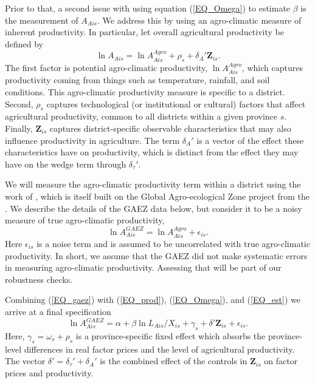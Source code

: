 \documentclass[11pt]{article}
\begin{document}
Prior to that, a second issue with using equation (\ref{EQ_Omega}) to estimate $\beta$ is the measurement of $A_{Ais}$. We address this by using an agro-climatic measure of inherent productivity. In particular, let overall agricultural productivity be defined by 
\begin{equation}
	\ln A_{Ais} = \ln A_{Ais}^{Agro} + \rho_s + \delta_{A}' \mathbf{Z}_{is}. \label{EQ_prod}
\end{equation}
The first factor is potential agro-climatic productivity, $\ln A_{Ais}^{Agro}$, which captures productivity coming from things such as temperature, rainfall, and soil conditions. This agro-climatic productivity measure is specific to a district. Second, $\rho_s$ captures technological (or institutional or cultural) factors that affect agricultural productivity, common to all districts within a given province $s$. Finally, $\mathbf{Z}_{is}$ captures district-specific observable characteristics that may also influence productivity in agriculture. The term $\delta_{A}'$ is a vector of the effect these characteristics have on productivity, which is distinct from the effect they may have on the wedge term through $\delta_{\tau}'$.

We will measure the agro-climatic productivity term within a district using the work of \cite{galorozak2016}, which is itself built on the Global Agro-ecological Zone project from the \cite{gaez}. We describe the details of the GAEZ data below, but consider it to be a noisy measure of true agro-climatic productivity,
\begin{equation}
	\ln A_{Ais}^{GAEZ} = \ln A_{Ais}^{Agro} + \epsilon_{is}. \label{EQ_gaez}
\end{equation}
Here $\epsilon_{is}$ is a noise term and is assumed to be uncorrelated with true agro-climatic productivity. In short, we assume that the GAEZ did not make systematic errors in measuring agro-climatic productivity. Assessing that will be part of our robustness checks.

Combining (\ref{EQ_gaez}) with (\ref{EQ_prod}), (\ref{EQ_Omega}), and (\ref{EQ_est}) we arrive at a final specification
\begin{equation}
	\ln A^{GAEZ}_{Ais} = \alpha + \beta \ln L_{Ais}/X_{is} + \gamma_{s} + \delta' \mathbf{Z}_{is} + \epsilon_{is}. \label{EQ_regress}
\end{equation}
Here, $\gamma_s = \omega_s + \rho_s$ is a province-specific fixed effect which absorbs the province-level differences in real factor prices and the level of agricultural productivity. The vector $\delta' = \delta_{\tau}' + \delta_{A}'$ is the combined effect of the controls in $\mathbf{Z}_{is}$ on factor prices and productivity.
\end{document}
